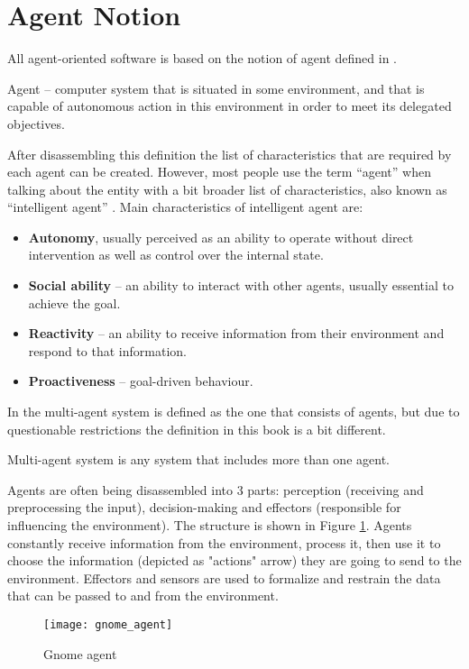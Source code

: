 \section{Agent Notion}

All agent-oriented software is based on the notion of agent defined in \cite{DUMMY:1}. \par
\theoremstyle{definition}
\begin{definition}{Agent}
    -- computer system that is situated in some environment, and that is capable of autonomous action in this environment in order to meet its delegated objectives.
\end{definition}
After disassembling this definition the list of characteristics that are required by each agent can be created. However, most people use the term ``agent'' when talking about the entity with a bit broader list of characteristics, also known as ``intelligent agent'' \cite{DUMMY:6}. Main characteristics of intelligent agent are:
\begin{itemize}
 \item \textbf{Autonomy}, usually perceived as an ability to operate without direct intervention as well as control over the internal state.
 \item \textbf{Social ability} -- an ability to interact with other agents, usually essential to achieve the goal.
 \item \textbf{Reactivity} -- an ability to receive information from their environment and respond to that information.
 \item \textbf{Proactiveness} -- goal-driven behaviour.
\end{itemize}
In \cite{dummy:1} the multi-agent system is defined as the one that consists of agents, but due to questionable restrictions the definition in this book is a bit different.
\begin{definition}{Multi-agent system}
is any system that includes more than one agent.
\end{definition}
Agents are often being disassembled into 3 parts: perception (receiving and preprocessing the input), decision-making and effectors (responsible for influencing the environment). The structure is shown in Figure \ref{GnomeAgent}. Agents constantly receive information from the environment, process it, then use it to choose the information (depicted as "actions" arrow) they are going to send to the environment. Effectors and sensors are used to formalize and restrain the data that can be passed to and from the environment. \par
    \begin{figure}[h!]
     \begin{center}
      \texttt{[image: gnome\_agent]}
      \caption{Gnome agent}
      \label{GnomeAgent}
      \end{center}
    \end{figure}

